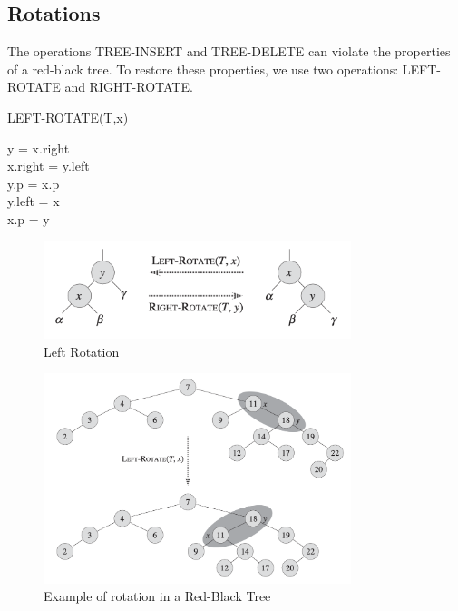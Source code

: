\subsection*{Rotations}

The operations TREE-INSERT and TREE-DELETE can violate the properties of a red-black tree. To restore these properties, we use two operations: LEFT-ROTATE and RIGHT-ROTATE.
\begin{algorithm}[H]
    \caption{LEFT-ROTATE(T,x)}
    y = x.right\\
    x.right = y.left\\
    y.p = x.p\\
    y.left = x\\
    x.p = y
\end{algorithm}

\begin{figure}
    \centering
    \includegraphics[width=0.8\textwidth]{assets/rotation_rbt.png}
    \caption{Left Rotation}
\end{figure}

\begin{figure}[H]
    \centering
    \includegraphics[width=0.8\textwidth]{assets/rotation_example_rbt.png}
    \caption{Example of rotation in a Red-Black Tree}
\end{figure}

